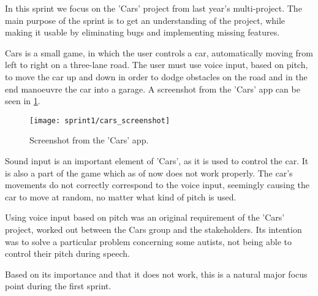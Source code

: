 In this sprint we focus on the 'Cars' project from last year's multi-project.
The main purpose of the sprint is to get an understanding of the project, while making it usable by eliminating bugs and implementing missing features.

Cars is a small game, in which the user controls a car, automatically moving from left to right on a three-lane road.
The user must use voice input, based on pitch, to move the car up and down in order to dodge obstacles on the road and in the end manoeuvre the car into a garage.
A screenshot from the 'Cars' app can be seen in \cref{fig:cars_screenshot}.

\begin{figure}[h]
\centering
\texttt{[image: sprint1/cars\_screenshot]}
\caption{Screenshot from the 'Cars' app.}
\label{fig:cars_screenshot}
\end{figure}

Sound input is an important element of 'Cars', as it is used to control the car.
It is also a part of the game which as of now does not work properly.
The car's movements do not correctly correspond to the voice input, seemingly causing the car to move at random, no matter what kind of pitch is used.

Using voice input based on pitch was an original requirement of the 'Cars' project, worked out between the Cars group and the stakeholders.
Its intention was to solve a particular problem concerning some autists, not being able to control their pitch during speech.

Based on its importance and that it does not work, this is a natural major focus point during the first sprint.